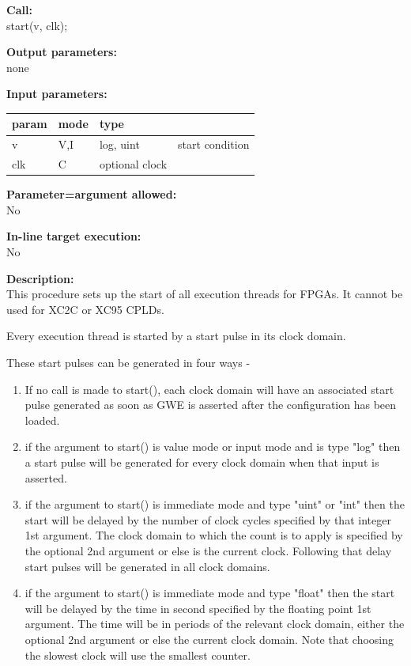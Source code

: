         {\bf Call:} \\
        start(v, clk);
        
        {\bf Output parameters:} \\
        none
        
        {\bf Input parameters:} \\
        \begin{tabular}{| l | l | l | l |}
        \hline
        param & mode & type & \\
        \hline \hline
        v     & V,I    & log, uint  & start condition \\ \hline
        clk   & C      & optional clock \\ \hline
        \end{tabular}
        
        {\bf Parameter=argument allowed:} \\
        No
        
        {\bf In-line target execution:} \\
        No
        
        {\bf Description:} \\
        This procedure sets up the start of all execution threads for FPGAs.
        It cannot be used for XC2C or XC95 CPLDs.
      
        Every execution thread is started by a start pulse in its clock domain.
        
        These start pulses can be generated in four ways -
        \begin{enumerate}
        \item   If no call is made to start(), each clock domain will have an
                associated start pulse generated as soon as GWE is asserted
                after the configuration has been loaded.
        \item   if the argument to start() is value mode or input mode and
                is type "log" then a start pulse will be generated for every
                clock domain when that input is asserted.
        \item   if the argument to start() is immediate mode and type "uint" or
                "int" then the start will be delayed by the number of clock
                cycles specified by that integer 1st argument. The clock domain
                to which the count is to apply is specified by the optional
                2nd argument or else is the current clock. Following that delay
                start pulses will be generated in all clock domains.
        \item   if the argument to start() is immediate mode and type "float"
                then the start will be delayed by the time in second specified
                by the floating point 1st argument. The time will be in periods of
                the relevant clock domain, either the optional 2nd argument or else
                the current clock domain. Note that choosing the slowest clock will
                use the smallest counter.
        \end{enumerate}
        
